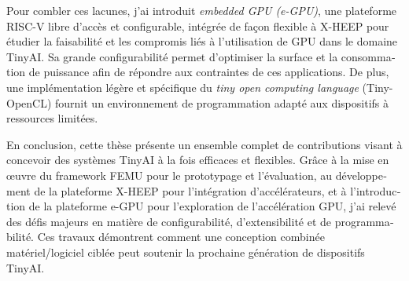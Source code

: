 \begin{otherlanguage}{french}
    Pour combler ces lacunes, j’ai introduit \textit{embedded GPU (e-GPU)}, une plateforme RISC-V libre d'accès et configurable, intégrée de façon flexible à X-HEEP pour étudier la faisabilité et les compromis liés à l’utilisation de GPU dans le domaine \mbox{TinyAI}. Sa grande configurabilité permet d’optimiser la surface et la consommation de puissance afin de répondre aux contraintes de ces applications. De plus, une implémentation légère et spécifique du \textit{tiny open computing language} (Tiny-OpenCL) fournit un environnement de programmation adapté aux dispositifs à ressources limitées.
    
    En conclusion, cette thèse présente un ensemble complet de contributions visant à concevoir des systèmes \mbox{TinyAI} à la fois efficaces et flexibles. Grâce à la mise en œuvre du framework \mbox{FEMU} pour le prototypage et l’évaluation, au développement de la plateforme X-HEEP pour l’intégration d’accélérateurs, et à l’introduction de la plateforme e-GPU pour l’exploration de l’accélération GPU, j’ai relevé des défis majeurs en matière de configurabilité, d’extensibilité et de programmabilité. Ces travaux démontrent comment une conception combinée matériel/logiciel ciblée peut soutenir la prochaine génération de dispositifs \mbox{TinyAI}.

\setlength{\parskip}{0em}

\end{otherlanguage}

